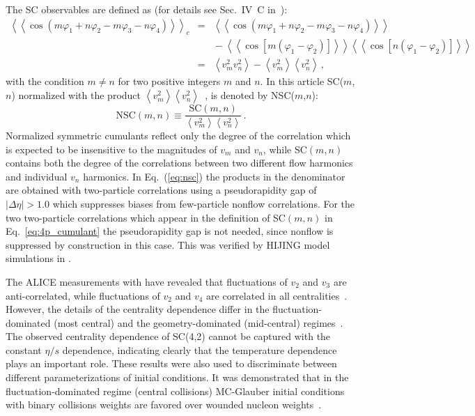 The SC observables are defined as (for details see Sec.~IV~C in~\cite{Bilandzic:2013kga}):
\begin{eqnarray}
\left<\left<\cos(m\varphi_1\!+\!n\varphi_2\!-\!m\varphi_3-\!n\varphi_4)\right>\right>_c &=& \left<\left<\cos(m\varphi_1\!+\!n\varphi_2\!-\!m\varphi_3-\!n\varphi_4)\right>\right>\nonumber\\
&&{}-\left<\left<\cos[m(\varphi_1\!-\!\varphi_2)]\right>\right>\left<\left<\cos[n(\varphi_1\!-\!\varphi_2)]\right>\right>\nonumber\\
&=&\left<v_{m}^2v_{n}^2\right>-\left<v_{m}^2\right>\left<v_{n}^2\right>\,,%
\label{eq:4p_cumulant}
\end{eqnarray}
%
with the condition $m\neq n$ for two positive integers $m$ and $n$.
In this article SC($m$,$n$) normalized with the product $\left<v_{m}^2\right>\left<v_{n}^2\right>$~\cite{ALICE:2016kpq,Giacalone:2016afq}, is denoted by NSC($m$,$n$):
%
\begin{equation}
\mathrm{NSC}(m,n) \equiv \frac{\mathrm{SC}(m,n)}{\left<v_{m}^2\right>\left<v_{n}^2\right>}\,.
\label{eq:nsc}
\end{equation}
%
Normalized symmetric cumulants reflect only the degree of the correlation which is expected to be insensitive to the magnitudes of $v_{m}$ and $v_{n}$, while SC$(m,n)$ contains both the degree of the correlations between two different flow harmonics and individual $v_{n}$ harmonics. In Eq.~(\ref{eq:nsc}) the products in the denominator are obtained with two-particle correlations using a pseudorapidity gap of $|\Delta\eta|>1.0$ which suppresses biases from few-particle nonflow correlations. For the two two-particle correlations which appear in the definition of SC$(m,n)$ in Eq.~\ref{eq:4p_cumulant} the pseudorapidity gap is not needed, since nonflow is suppressed by construction in this case. This was verified by HIJING model simulations in \cite{ALICE:2016kpq}.

The ALICE measurements with \cite{ALICE:2016kpq} have revealed that fluctuations of $v_2$ and $v_3$ are anti-correlated, while fluctuations of $v_2$ and $v_4$ are correlated in all centralities~\cite{ALICE:2016kpq}. However, the details of the centrality dependence differ in the fluctuation-dominated (most central) and the geometry-dominated (mid-central) regimes~\cite{ALICE:2016kpq}. The observed centrality dependence of SC(4,2) cannot be captured with the constant $\eta/s$ dependence, indicating clearly that the temperature dependence plays an important role. These results were also used to discriminate between different parameterizations of initial conditions. It was demonstrated that in the fluctuation-dominated regime (central collisions) MC-Glauber initial conditions with binary collisions weights are favored over wounded nucleon weights~\cite{ALICE:2016kpq}. 

